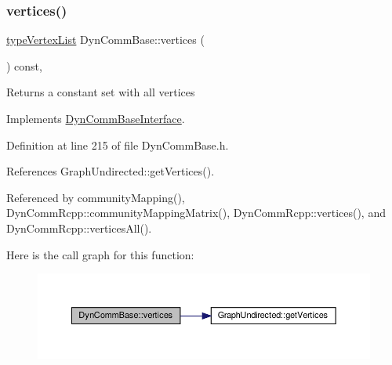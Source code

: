 \subsubsection{\texorpdfstring{vertices()}{vertices()}\hspace{0.1cm}{\footnotesize\ttfamily [1/2]}}
{\footnotesize\ttfamily \hyperlink{graphInterface_8h_a21d54d8a139def524d3b0d6f71ec4974}{type\+Vertex\+List} Dyn\+Comm\+Base\+::vertices (\begin{DoxyParamCaption}{ }\end{DoxyParamCaption}) const\hspace{0.3cm}{\ttfamily [inline]}, {\ttfamily [virtual]}}

\begin{DoxyReturn}{Returns}
a constant set with all vertices 
\end{DoxyReturn}


Implements \hyperlink{classDynCommBaseInterface_af5023d7b81f4413cc8052df01067f71f}{Dyn\+Comm\+Base\+Interface}.



Definition at line 215 of file Dyn\+Comm\+Base.\+h.



References Graph\+Undirected\+::get\+Vertices().



Referenced by community\+Mapping(), Dyn\+Comm\+Rcpp\+::community\+Mapping\+Matrix(), Dyn\+Comm\+Rcpp\+::vertices(), and Dyn\+Comm\+Rcpp\+::vertices\+All().

Here is the call graph for this function\+:
\nopagebreak
\begin{figure}[H]
\begin{center}
\leavevmode
\includegraphics[width=350pt]{classDynCommBase_ae240fba572935f26a72f73e39e115169_cgraph}
\end{center}
\end{figure}
\mbox{\label{classDynCommBase_ae56cd1fc5a69fcd4d0e0a073f3f2e36b}} 
